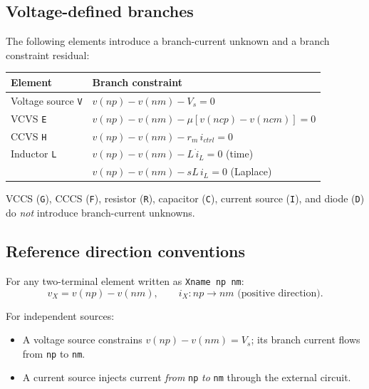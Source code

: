 \documentclass[11pt,a4paper]{article}
\newcommand{\code}[1]{\texttt{#1}}
\begin{document}
\subsection{Voltage-defined branches}

The following elements introduce a branch-current unknown and a branch
constraint residual:

\begin{center}
\begin{tabular}{ll}
\toprule
Element & Branch constraint \\
\midrule
Voltage source \code{V}  & \(v(np) - v(nm) - V_s = 0\) \\
VCVS \code{E}            & \(v(np) - v(nm) - \mu[v(ncp)-v(ncm)] = 0\) \\
CCVS \code{H}            & \(v(np) - v(nm) - r_m\,i_{ctrl} = 0\) \\
Inductor \code{L}        & \(v(np) - v(nm) - L\,\dot{i}_L = 0\) (time) \\
                         & \(v(np) - v(nm) - sL\,i_L = 0\) (Laplace) \\
\bottomrule
\end{tabular}
\end{center}

VCCS (\code{G}), CCCS (\code{F}), resistor (\code{R}), capacitor (\code{C}),
current source (\code{I}), and diode (\code{D}) do \emph{not} introduce
branch-current unknowns.

\subsection{Reference direction conventions}

For any two-terminal element written as \code{Xname np nm}:
\begin{equation}
    v_X = v(np) - v(nm),
    \qquad
    i_X: np \to nm \text{ (positive direction)}.
\end{equation}

For independent sources:
\begin{itemize}[noitemsep]
    \item A voltage source constrains \(v(np) - v(nm) = V_s\);
          its branch current flows from \code{np} to \code{nm}.
    \item A current source injects current \emph{from} \code{np} \emph{to} \code{nm}
          through the external circuit.
\end{itemize}

\end{document}
